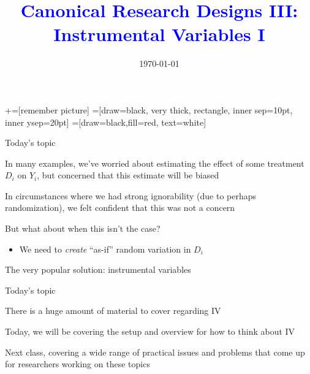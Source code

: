 \documentclass[notes,11pt, aspectratio=169]{beamer}
\title[]{\textcolor{blue}{Canonical Research Designs III:\\ Instrumental Variables I }}
\author[PGP]{}
\institute[FRBNY]{\small{\begin{tabular}{c}
  Paul Goldsmith-Pinkham  \\
\end{tabular}}}
\date{\today}
\newenvironment{wideitemize}{\itemize\addtolength{\itemsep}{10pt}}{\enditemize}
\begin{document}
\newcommand\marktopleft[1]{%
    \tikz[overlay,remember picture] 
        \node (marker-#1-a) at (-.3em,.3em) {};%
}
\newcommand\markbottomright[2]{%
    \tikz[overlay,remember picture] 
        \node (marker-#1-b) at (0em,0em) {};%
}
+=[remember picture] 
 =[draw=black, very thick, rectangle, inner sep=10pt, inner ysep=20pt]
 =[draw=black,fill=red, text=white]

\begin{frame}
\maketitle
\end{frame}


\begin{frame}{Today's topic}
  \begin{wideitemize}
  \item In many examples, we've worried about estimating the effect
    of some treatment $D_{i}$ on $Y_{i}$, but concerned that this
    estimate will be biased
  \item In circumstances where we had strong ignorability (due to
    perhaps randomization), we felt confident that this was not a concern
  \item But what about when this isn't the case?
  \begin{itemize}
    \item  We need to \emph{create}  ``as-if'' random variation in $D_{i}$
  \end{itemize}
  \item The very popular solution: instrumental variables
  \end{wideitemize}
\end{frame}

\begin{frame}{Today's topic}
  \begin{wideitemize}
  \item There is a huge amount of material to cover regarding IV
  \item Today, we will be covering the setup and overview for how to think about IV
  \item Next class, covering a wide range of practical issues and
    problems that come up for researchers working on these topics
  \end{wideitemize}
\end{frame}
\end{document}

